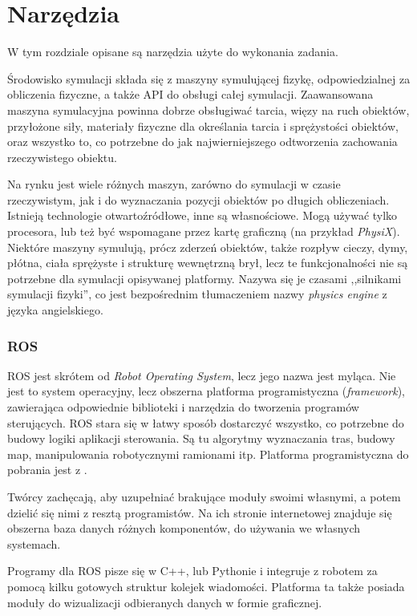 \chapter{Narzędzia} 
\label{sec:tools}
	W tym rozdziale opisane są narzędzia użyte do wykonania zadania.

	Środowisko symulacji składa się z maszyny symulującej fizykę, odpowiedzialnej za obliczenia fizyczne, a także API do obsługi całej symulacji.
	Zaawansowana maszyna symulacyjna powinna dobrze obsługiwać tarcia, więzy na ruch obiektów, przyłożone siły, materiały fizyczne dla określania tarcia i sprężystości obiektów, 
	oraz wszystko to, co potrzebne do jak najwierniejszego odtworzenia zachowania rzeczywistego obiektu.

	Na rynku jest wiele różnych maszyn, zarówno do symulacji w czasie rzeczywistym, jak i do wyznaczania pozycji obiektów po długich obliczeniach.
	Istnieją technologie otwartoźródłowe, inne są własnościowe. Mogą używać tylko procesora, lub też być wspomagane przez kartę graficzną (na przykład \emph{PhysiX}).
	Niektóre maszyny symulują, prócz zderzeń obiektów, także rozpływ cieczy, dymy, płótna, ciała sprężyste i strukturę wewnętrzną brył, 
	lecz te funkcjonalności nie są potrzebne dla symulacji opisywanej platformy. Nazywa się je czasami ,,silnikami symulacji fizyki'', co jest bezpośrednim tłumaczeniem nazwy
	\emph{physics engine} z języka angielskiego.
	
	\subsection{ROS}
		ROS jest skrótem od \emph{Robot Operating System}, lecz jego nazwa jest myląca.
		Nie jest to system operacyjny, lecz obszerna platforma programistyczna (\emph{framework}), zawierająca odpowiednie biblioteki i narzędzia do tworzenia programów sterujących.
		ROS stara się w łatwy sposób dostarczyć wszystko, co potrzebne do budowy logiki aplikacji sterowania.
		Są tu algorytmy wyznaczania tras, budowy map, manipulowania robotycznymi ramionami itp. 
		Platforma programistyczna do pobrania jest z \cite{ros_website}.

		Twórcy zachęcają, aby uzupełniać brakujące moduły swoimi własnymi, a potem dzielić się nimi z resztą programistów.
		Na ich stronie internetowej znajduje się obszerna baza danych różnych komponentów, do używania we własnych systemach.

		Programy dla ROS pisze się w C++, lub Pythonie i integruje z robotem za pomocą kilku gotowych struktur kolejek wiadomości.
		Platforma ta także posiada moduły do wizualizacji odbieranych danych w formie graficznej.

